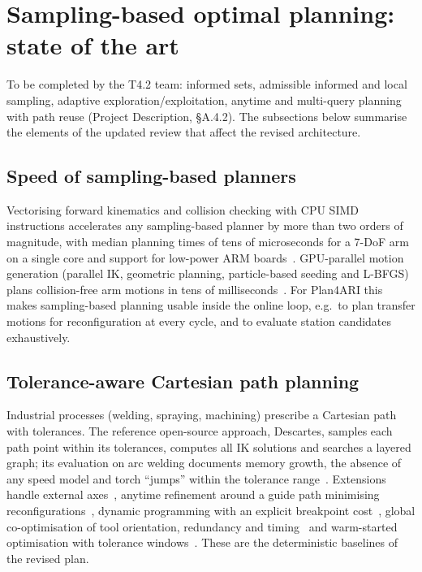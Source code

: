 \section{Sampling-based optimal planning: state of the art}\label{sec:sbp}

\begin{planbox}
To be completed by the T4.2 team: informed sets, admissible informed and local sampling, adaptive exploration/exploitation, anytime and multi-query planning with path reuse (Project Description, \S A.4.2). The subsections below summarise the elements of the updated review that affect the revised architecture.
\end{planbox}

\subsection{Speed of sampling-based planners}
Vectorising forward kinematics and collision checking with CPU SIMD instructions accelerates any sampling-based planner by more than two orders of magnitude, with median planning times of tens of microseconds for a 7-DoF arm on a single core and support for low-power ARM boards~\cite{thomason2024vamp}. GPU-parallel motion generation (parallel IK, geometric planning, particle-based seeding and L-BFGS) plans collision-free arm motions in tens of milliseconds~\cite{sundaralingam2023curobo}. For Plan4ARI this makes sampling-based planning usable inside the online loop, e.g.\ to plan transfer motions for reconfiguration at every cycle, and to evaluate station candidates exhaustively.

\subsection{Tolerance-aware Cartesian path planning}
Industrial processes (welding, spraying, machining) prescribe a Cartesian path with tolerances. The reference open-source approach, Descartes, samples each path point within its tolerances, computes all IK solutions and searches a layered graph; its evaluation on arc welding documents memory growth, the absence of any speed model and torch ``jumps'' within the tolerance range~\cite{demaeyer2017descartes}. Extensions handle external axes~\cite{sun2020externalaxis}, anytime refinement around a guide path minimising reconfigurations~\cite{wang2025anytimetracking}, dynamic programming with an explicit breakpoint cost~\cite{yin2024dpbreakpoints}, global co-optimisation of tool orientation, redundancy and timing~\cite{chen2025cooptimization} and warm-started optimisation with tolerance windows~\cite{weingartshofer2023pathframework}. These are the deterministic baselines of the revised plan.

